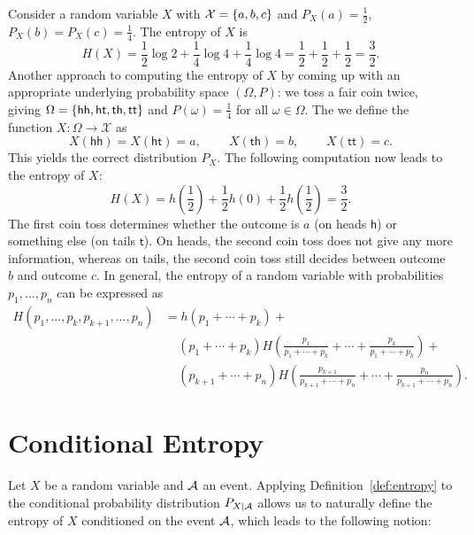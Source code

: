 \begin{example}
Consider a random variable $X$ with $\mathcal{X} = \{a,b,c\}$ and $P_X(a) = \frac{1}{2}$, $P_X(b) = P_X(c) = \frac{1}{4}$. The entropy of $X$ is
\[
H(X) = \frac{1}{2} \log 2 + \frac{1}{4} \log 4 + \frac{1}{4} \log 4 = \frac{1}{2} + \frac{1}{2} + \frac{1}{2} = \frac{3}{2}.
\]
Another approach to computing the entropy of $X$ by coming up with an appropriate underlying probability space $(\Omega,P)$: we toss a fair coin twice, giving $\Omega = \{\mathsf{hh}, \mathsf{ht}, \mathsf{th}, \mathsf{tt}\}$ and $P(\omega) = \frac{1}{4}$ for all $\omega \in \Omega$. The we define the function $X : \Omega \to \mathcal{X}$ as
\[
X(\mathsf{hh}) = X(\mathsf{ht}) = a, \ \ \ \ \ \ \ \ \ \ X(\mathsf{th}) = b, \ \ \ \ \ \ \ \ \ \ X(\mathsf{tt}) = c.
\]
This yields the correct distribution $P_X$. The following computation now leads to the entropy of $X$:
\[
H(X) = h\left(\frac{1}{2}\right) + \frac{1}{2}h(0) + \frac{1}{2}h\left(\frac{1}{2}\right) = \frac{3}{2}.
\]
The first coin toss determines whether the outcome is $a$ (on heads $\mathsf{h}$) or something else (on tails $\mathsf{t}$). On heads, the second coin toss does not give any more information, whereas on tails, the second coin toss still decides between outcome $b$ and outcome $c$. In general, the entropy of a random variable with probabilities $p_1, ..., p_n$ can be expressed as
\begin{align}
H(p_1, ..., p_k, p_{k+1}, ..., p_n) &= h(p_1 + \cdots + p_k) +\nonumber\\
&\ \ \ \ \ (p_1 + \cdots + p_k) H\left(\frac{p_1}{p_1+\cdots+p_k} + \cdots + \frac{p_k}{p_1+\cdots+p_k}\right) +\nonumber\\
&\ \ \ \ \ (p_{k+1} + \cdots + p_n)H\left(\frac{p_{k+1}}{p_{k+1}+\cdots+p_n} + \cdots + \frac{p_n}{p_{k+1}+\cdots+p_n}\right).
\end{align}
\end{example}

\section{Conditional Entropy}
Let $X$ be a random variable and $\cal A$ an event. Applying Definition~\ref{def:entropy} to the conditional probability distribution $P_{X|\cal A}$ allows us to naturally define the entropy of $X$ conditioned on the event $\cal A$, which leads to the following notion:


